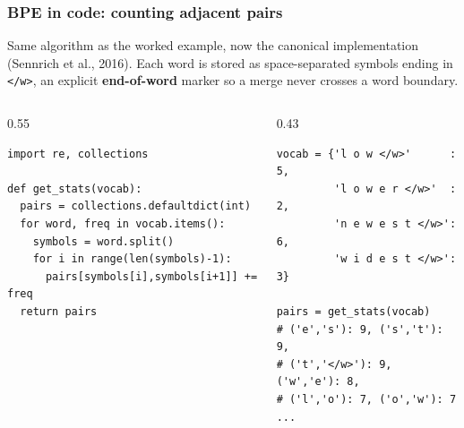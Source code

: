\documentclass[aspectratio=169]{beamer}
\begin{document}
\begin{frame}[fragile]
\frametitle{BPE in code: counting adjacent pairs}
\vspace{-0.1cm}
{\small Same algorithm as the worked example, now the canonical implementation (Sennrich et al., 2016). Each word is stored as space-separated symbols ending in \texttt{</w>}, an explicit \textbf{end-of-word} marker so a merge never crosses a word boundary.}

\vspace{0.15cm}
\begin{columns}[T]
\begin{column}{0.55\textwidth}
\begin{lstlisting}
import re, collections

def get_stats(vocab):
  pairs = collections.defaultdict(int)
  for word, freq in vocab.items():
    symbols = word.split()
    for i in range(len(symbols)-1):
      pairs[symbols[i],symbols[i+1]] += freq
  return pairs
\end{lstlisting}
\end{column}
\begin{column}{0.43\textwidth}
\begin{lstlisting}
vocab = {'l o w </w>'      : 5,
         'l o w e r </w>'  : 2,
         'n e w e s t </w>': 6,
         'w i d e s t </w>': 3}

pairs = get_stats(vocab)
# ('e','s'): 9, ('s','t'): 9,
# ('t','</w>'): 9, ('w','e'): 8,
# ('l','o'): 7, ('o','w'): 7 ...
\end{lstlisting}
\end{column}
\end{columns}

\vspace{0.15cm}
\begin{center}
\end{center}
\end{frame}
\end{document}
